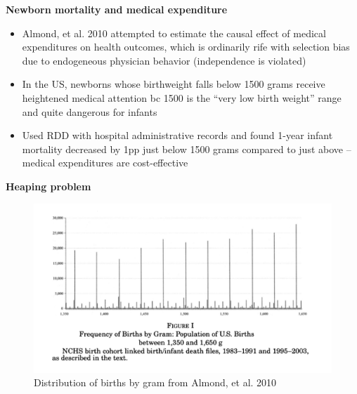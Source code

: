 \documentclass[notes=show]{beamer}
\begin{document}
\begin{frame}[plain]
\begin{center}
\textbf{Newborn mortality and medical expenditure}
\end{center}

\begin{itemize}
\item Almond, et al. 2010 attempted to estimate the causal effect of medical expenditures on health outcomes, which is ordinarily rife with selection bias due to endogeneous physician behavior (independence is violated)
\item In the US, newborns whose birthweight falls below 1500 grams receive heightened medical attention bc 1500 is the ``very low birth weight'' range and quite dangerous for infants
\item Used RDD with hospital administrative records and found 1-year infant mortality decreased by 1pp just below 1500 grams compared to just above -- medical expenditures are cost-effective
\end{itemize}

\end{frame}


\begin{frame}[plain]
\begin{center}
\textbf{Heaping problem}
\end{center}


\begin{figure}[htb]
\centering	\includegraphics[scale=0.08]{./lecture_includes/heaping.jpg}%
\caption{Distribution of births by gram from Almond, et al. 2010}
\end{figure}

\end{frame}
\end{document}
